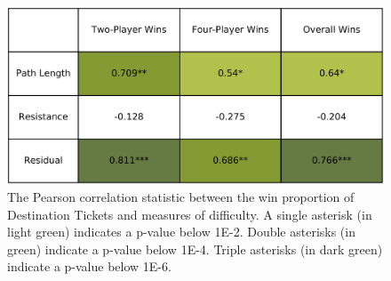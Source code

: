 \begin{figure}[h]
    \centering
    \includegraphics[scale=.12]{figures/pearsons_table.png}
    \caption{The Pearson correlation statistic between
    the win proportion of Destination Tickets
    and measures of difficulty.
    A single asterisk (in light green) indicates a p-value
    below 1E-2. Double asterisks (in green) indicate a
    p-value below 1E-4. Triple asterisks (in dark green)
    indicate a p-value below 1E-6.}
    \label{fig:correlation_table}
\end{figure}

